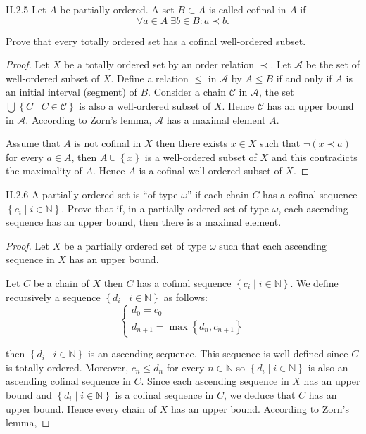 \begin{problem}{II.2.5}
Let \( A \) be partially ordered. A set \( B \subset A \) is called cofinal in \(A\) if
\[
	\forall a\in A\; \exists b\in B: a \prec b.
\]

Prove that every totally ordered set has a cofinal well-ordered subset.
\end{problem}

\begin{proof}
	Let \( X \) be a totally ordered set by an order relation \(\prec\). Let \( \mathscr{A} \) be the set of well-ordered subset of \( X \). Define a relation \( \le \) in \( \mathscr{A} \) by \( A \le B \) if and only if \( A \) is an initial interval (segment) of \( B \). Consider a chain \( \mathscr{C} \) in \( \mathscr{A} \), the set \( \bigcup\left\{ C \mid C \in \mathscr{C} \right\} \) is also a well-ordered subset of \( X \). Hence \( \mathscr{C} \) has an upper bound in \( \mathscr{A} \). According to Zorn's lemma, \( \mathscr{A} \) has a maximal element \( A \).

	Assume that \( A \) is not cofinal in \( X \) then there exists \( x \in X \) such that \( \neg (x \prec a) \) for every \( a \in A \), then \( A \cup \left\{ x \right\} \) is a well-ordered subset of \( X \) and this contradicts the maximality of \( A \). Hence \( A \) is a cofinal well-ordered subset of \( X \).
\end{proof}

\begin{problem}{II.2.6}
A partially ordered set is ``of type \(\omega\)'' if each chain \(C\) has a cofinal sequence \( \left\{ c_{i} \mid i \in \mathbb{N} \right\} \). Prove that if, in a partially ordered set of type \(\omega\), each ascending sequence has an upper bound, then there is a maximal element.
\end{problem}

\begin{proof}
	Let \(X\) be a partially ordered set of type \(\omega\) such that each ascending sequence in \(X\) has an upper bound.

	Let \( C \) be a chain of \( X \) then \( C \) has a cofinal sequence \( \left\{ c_{i} \mid i \in \mathbb{N} \right\} \). We define recursively a sequence \( \left\{ d_{i} \mid i \in \mathbb{N} \right\} \) as follows:
	\[
		\begin{cases}
			d_{0} = c_{0} \\
			d_{n+1} = \max\left\{ d_{n}, c_{n+1} \right\}
		\end{cases}
	\]

	then \( \left\{ d_{i} \mid i \in \mathbb{N} \right\} \) is an ascending sequence. This sequence is well-defined since \( C \) is totally ordered. Moreover, \( c_{n} \leq d_{n} \) for every \( n \in \mathbb{N} \) so \( \left\{ d_{i} \mid i \in \mathbb{N} \right\} \) is also an ascending cofinal sequence in \( C \). Since each ascending sequence in \( X \) has an upper bound and \( \left\{ d_{i} \mid i \in \mathbb{N} \right\} \) is a cofinal sequence in \( C \), we deduce that \( C \) has an upper bound. Hence every chain of \(X\) has an upper bound. According to Zorn's lemma,
\end{proof}

